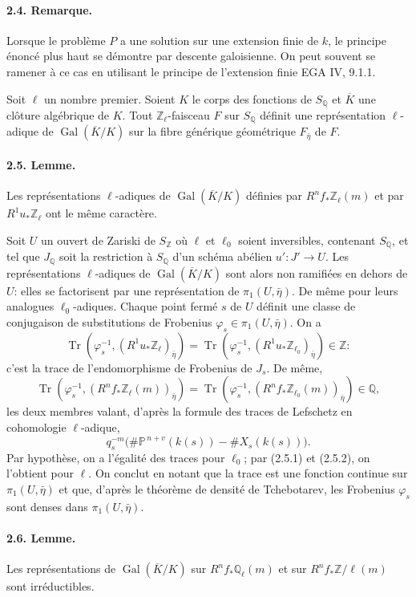 \documentclass[10pt]{article}
\newcommand{\Pj}{\mathbb P}
\newcommand{\Q}{\mathbb Q}
\newcommand{\Z}{\mathbb Z}
\newcommand{\Gal}{\operatorname{Gal}}
\newcommand{\Tr}{\operatorname{Tr}}
\begin{document}
\paragraph{2.4. Remarque.} Lorsque le problème \(P\) a une solution sur une extension finie de \(k\), le principe énoncé plus haut se démontre par descente galoisienne. On peut souvent se ramener à ce cas en utilisant le principe de l'extension finie EGA IV, 9.1.1.

Soit \(\ell\) un nombre premier. Soient \(K\) le corps des fonctions de \(S_\Q\) et \(\overline K\) une clôture algébrique de \(K\). Tout \(\Z_\ell\)-faisceau \(F\) sur \(S_\Q\) définit une représentation \(\ell\)-adique de \(\Gal(\overline K/K)\) sur la fibre générique géométrique \(F_{\bar\eta}\) de \(F\).

\paragraph{2.5. Lemme.} Les représentations \(\ell\)-adiques de \(\Gal(\overline K/K)\) définies par \(R^nf_*\Z_\ell(m)\) et par \(R^1u_*\Z_\ell\) ont le même caractère.

Soit \(U\) un ouvert de Zariski de \(S_\Z\) où \(\ell\) et \(\ell_0\) soient inversibles, contenant \(S_\Q\), et tel que \(J_\Q\) soit la restriction à \(S_\Q\) d'un schéma abélien \(u':J'\to U\). Les représentations \(\ell\)-adiques de \(\Gal(\overline K/K)\) sont alors non ramifiées en dehors de \(U\): elles se factorisent par une représentation de \(\pi_1(U,\bar\eta)\). De même pour leurs analogues \(\ell_0\)-adiques. Chaque point fermé \(s\) de \(U\) définit une classe de conjugaison de substitutions de Frobenius \(\varphi_s\in\pi_1(U,\bar\eta)\). On a
\[
\tag{2.5.1}
\Tr(\varphi_s^{-1},(R^1u_*\Z_\ell)_{\bar\eta})
=\Tr(\varphi_s^{-1},(R^1u_*\Z_{\ell_0})_{\bar\eta})\in\Z:
\]
c'est la trace de l'endomorphisme de Frobenius de \(J_s\). De même,
\[
\tag{2.5.2}
\Tr(\varphi_s^{-1},(R^nf_*\Z_\ell(m))_{\bar\eta})
=\Tr(\varphi_s^{-1},(R^nf_*\Z_{\ell_0}(m))_{\bar\eta})\in\Q,
\]
les deux membres valant, d'après la formule des traces de Lefschetz en cohomologie \(\ell\)-adique,
\[
q_s^{-m}\bigl(\#\Pj^{\,n+v}(k(s))-\#X_s(k(s))\bigr).
\]
Par hypothèse, on a l'égalité des traces pour \(\ell_0\); par (2.5.1) et (2.5.2), on l'obtient pour \(\ell\). On conclut en notant que la trace est une fonction continue sur \(\pi_1(U,\bar\eta)\) et que, d'après le théorème de densité de Tchebotarev, les Frobenius \(\varphi_s\) sont denses dans \(\pi_1(U,\bar\eta)\).

\paragraph{2.6. Lemme.} Les représentations de \(\Gal(\overline K/K)\) sur \(R^nf_*\Q_\ell(m)\) et sur \(R^nf_*\Z/\ell(m)\) sont irréductibles.
\end{document}
